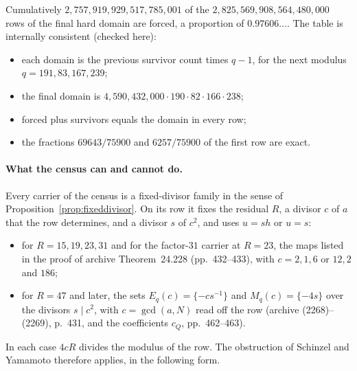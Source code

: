 Cumulatively $2{,}757{,}919{,}929{,}517{,}785{,}001$ of the $2{,}825{,}569{,}908{,}564{,}480{,000}$ rows of the final hard domain are forced, a proportion of $0.97606\ldots$.
The table is internally consistent (checked here):
\begin{itemize}
\item each domain is the previous survivor count times $q-1$, for the next modulus $q=191,83,167,239$;
\item the final domain is $4{,}590{,}432{,}000\cdot190\cdot82\cdot166\cdot238$;
\item forced plus survivors equals the domain in every row;
\item the fractions $69643/75900$ and $6257/75900$ of the first row are exact.
\end{itemize}


\paragraph{What the census can and cannot do.}
Every carrier of the census is a fixed-divisor family in the sense of Proposition~\ref{prop:fixeddivisor}. On its row it fixes the residual $R$, a divisor $c$ of $a$ that the row determines, and a divisor $s$ of $c^2$, and uses $u=sh$ or $u=s$:
\begin{itemize}
\item for $R=15,19,23,31$ and for the factor-$31$ carrier at $R=23$, the maps listed in the proof of archive Theorem~24.228 (pp.~432--433), with $c=2,1,6$ or $12,2$ and $186$;
\item for $R=47$ and later, the sets $E_q(c)=\{-cs^{-1}\}$ and $M_q(c)=\{-4s\}$ over the divisors $s\mid c^2$, with $c=\gcd(a,N)$ read off the row (archive (2268)--(2269), p.~431, and the coefficients $c_Q$, pp.~462--463).
\end{itemize}
In each case $4cR$ divides the modulus of the row. The obstruction of Schinzel and Yamamoto therefore applies, in the following form.

